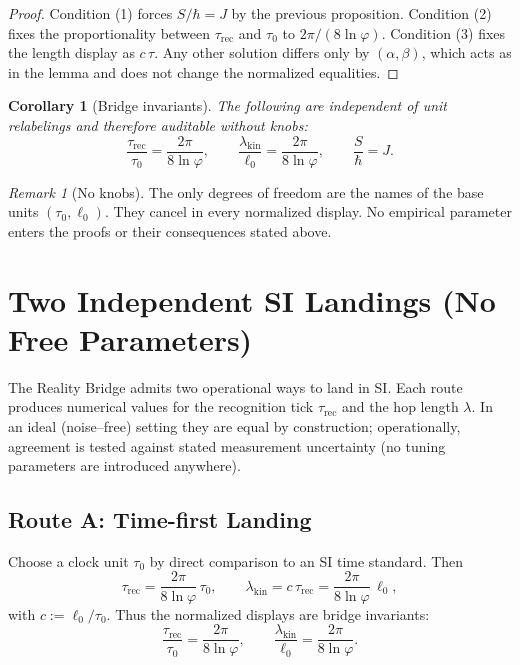 \documentclass[11pt]{article}
\theoremstyle{plain}
\newtheorem{corollary}{Corollary}
\theoremstyle{definition}
\theoremstyle{remark}
\newtheorem*{remark}{Remark}
\begin{document}
\begin{proof}
Condition (1) forces \(S/\hbar=J\) by the previous proposition. Condition (2) fixes the proportionality between \(\tau_{\mathrm{rec}}\) and \(\tau_{0}\) to \(2\pi/(8\ln\varphi)\). Condition (3) fixes the length display as \(c\,\tau\). Any other solution differs only by \((\alpha,\beta)\), which acts as in the lemma and does not change the normalized equalities.
\end{proof}

\begin{corollary}[Bridge invariants]
The following are independent of unit relabelings and therefore auditable without knobs:
\[
\frac{\tau_{\mathrm{rec}}}{\tau_{0}}=\frac{2\pi}{8\ln\varphi},\qquad
\frac{\lambda_{\mathrm{kin}}}{\ell_{0}}=\frac{2\pi}{8\ln\varphi},\qquad
\frac{S}{\hbar}=J.
\]
\end{corollary}

\begin{remark}[No knobs]
The only degrees of freedom are the names of the base units \((\tau_{0},\ell_{0})\). They cancel in every normalized display. No empirical parameter enters the proofs or their consequences stated above.
\end{remark}

\section{Two Independent SI Landings (No Free Parameters)}
The Reality Bridge admits two operational ways to land in SI. Each route produces numerical values for the recognition tick \(\tau_{\mathrm{rec}}\) and the hop length \(\lambda\). In an ideal (noise–free) setting they are equal by construction; operationally, agreement is tested against stated measurement uncertainty (no tuning parameters are introduced anywhere).

\subsection*{Route A: Time-first Landing}
Choose a clock unit \(\tau_{0}\) by direct comparison to an SI time standard. Then
\[
\tau_{\mathrm{rec}}=\frac{2\pi}{8\ln\varphi}\,\tau_{0},
\qquad
\lambda_{\mathrm{kin}}=c\,\tau_{\mathrm{rec}}=\frac{2\pi}{8\ln\varphi}\,\ell_{0},
\]
with \(c:=\ell_{0}/\tau_{0}\). Thus the normalized displays are bridge invariants:
\[
\frac{\tau_{\mathrm{rec}}}{\tau_{0}}=\frac{2\pi}{8\ln\varphi},
\qquad
\frac{\lambda_{\mathrm{kin}}}{\ell_{0}}=\frac{2\pi}{8\ln\varphi}.
\]
\end{document}
